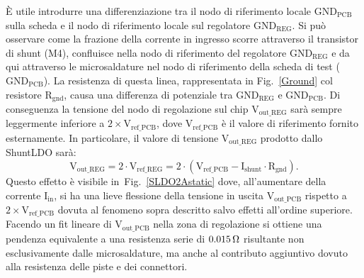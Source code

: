 \`E utile introdurre una differenziazione tra il nodo di riferimento locale $\mathrm{GND_{PCB}}$ sulla scheda e il nodo di riferimento locale sul regolatore $\mathrm{GND_{REG}}$. Si pu\`o osservare come la frazione della corrente in ingresso scorre attraverso il transistor di shunt (M4), confluisce nella nodo di riferimento del regolatore $\mathrm{GND_{REG}}$ e da qui attraverso le microsaldature nel nodo di riferimento della scheda di test ($\mathrm{GND_{PCB}}$). 
La resistenza di questa linea, rappresentata in Fig.~\ref{Ground} col resistore $\mathrm{R_{gnd}}$, causa una differenza di potenziale tra $\mathrm{GND_{REG}}$ e $\mathrm{GND_{PCB}}$. Di conseguenza la tensione del nodo di regolazione sul chip $\mathrm{V_{out{\_}REG}}$ sar\`a sempre leggermente inferiore a $\mathrm{2\times V_{ref {\_} PCB}}$, dove $\mathrm{V_{ref {\_} PCB}}$ \`e il valore di riferimento fornito esternamente. In particolare, il valore di tensione $\mathrm{V_{out{\_}REG}}$ prodotto dallo ShuntLDO sarà:
\begin{equation}
  \mathrm{V_{out{\_}REG} = 2 \cdot V_{ref{\_}REG} = 2 \cdot ( V_{ref {\_} PCB} - I_{shunt} \cdot R_{gnd} )}.
\end{equation}
Questo effetto è visibile in~Fig.~\ref{SLDO2Astatic} dove, all'aumentare della corrente $\mathrm{I_{in}}$, si ha una lieve flessione della tensione in uscita $\mathrm{V_{out{\_}PCB}}$ rispetto a $\mathrm{2 \times V_{ref{\_}PCB}}$ dovuta al fenomeno sopra descritto salvo effetti all'ordine superiore. Facendo un fit lineare di $\mathrm{V_{out{\_}PCB}}$ nella zona di regolazione si ottiene una pendenza equivalente a una resistenza serie di $0.015{\rm \, \Omega}$ risultante non esclusivamente dalle microsaldature, ma anche al contributo aggiuntivo dovuto alla resistenza delle piste e dei connettori.


